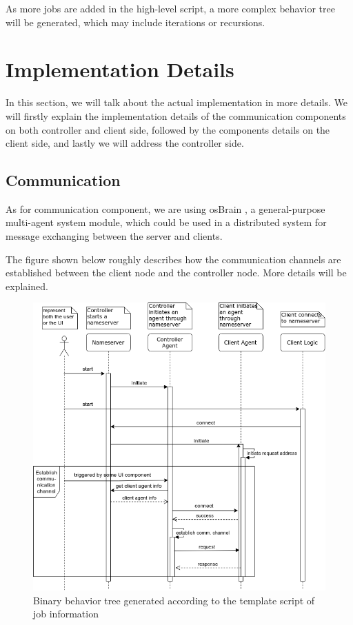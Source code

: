 \documentclass[12pt]{report}
\begin{document}
As more jobs are added in the high-level script, a more complex behavior tree will be generated, which may include iterations or recursions.

\section{Implementation Details}

In this section, we will talk about the actual implementation in more details. We will firstly explain the implementation details of the communication components on both controller and client side, followed by the components details on the client side, and lastly we will address the controller side.

\subsection{Communication}

As for communication component, we are using osBrain \citep{osBrain}, a general-purpose multi-agent system module, which could be used in a distributed system for message exchanging between the server and clients.

The figure shown below roughly describes how the communication channels are established between the client node and the controller node. More details will be explained.

\begin{figure}[h!]
	\centering
	\includegraphics[width=1\textwidth]{./pictures/comm-uml}
	\caption{Binary behavior tree generated according to the template script of job information}
\end{figure}
\end{document}
